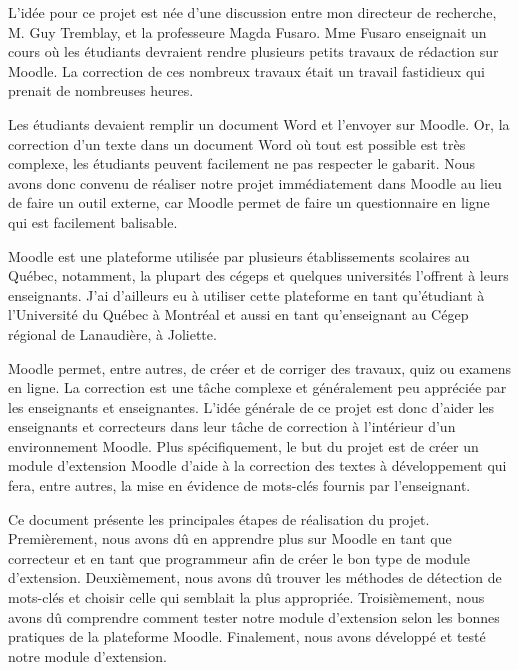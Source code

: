 \begin{introduction}

L'id\'ee pour ce projet est n\'ee d'une discussion entre mon directeur de recherche, M. Guy Tremblay, et la professeure Magda Fusaro.
Mme Fusaro enseignait un cours o\`u les \'etudiants devraient rendre plusieurs petits travaux de r\'edaction sur Moodle.
La correction de ces nombreux travaux \'etait un travail fastidieux qui prenait de nombreuses heures.

Les \'etudiants devaient remplir un document Word et l'envoyer sur Moodle.
Or, la correction d'un texte dans un document Word o\`u tout est possible est tr\`es complexe, les \'etudiants peuvent facilement ne pas respecter le gabarit.
Nous avons donc convenu de r\'ealiser notre projet imm\'ediatement dans Moodle au lieu de faire un outil externe, car Moodle permet de faire un questionnaire en ligne qui est facilement balisable.

Moodle est une plateforme utilisée par plusieurs établissements scolaires au Québec, notamment, la plupart des cégeps et quelques universités l'offrent à leurs enseignants.
J'ai d'ailleurs eu à utiliser cette plateforme en tant qu'étudiant à l'Université du Québec à Montréal et aussi en tant qu'enseignant au Cégep régional de Lanaudière, à Joliette.

Moodle permet, entre autres, de créer et de corriger des travaux, quiz ou examens en ligne.
La correction est une tâche complexe et g\'en\'eralement peu appréciée par les enseignants et enseignantes.
L'idée générale de ce projet est donc d'aider les enseignants et correcteurs dans leur tâche de correction à l'intérieur d'un environnement Moodle.
Plus sp\'ecifiquement, le but du projet est de créer un module d'extension Moodle d'aide à la correction des textes à développement qui fera, entre autres, la mise en évidence de mots-clés fournis par l'enseignant.

Ce document pr\'esente les principales étapes de réalisation du projet.
Premièrement, nous avons d\^u en apprendre plus sur Moodle en tant que correcteur et en tant que programmeur afin de créer le bon type de module d'extension.
Deuxièmement, nous avons d\^u trouver les méthodes de détection de mots-clés et choisir celle qui semblait la plus appropri\'ee.
Troisièmement, nous avons d\^u comprendre comment tester notre module d'extension selon les bonnes pratiques de la plateforme Moodle.
Finalement, nous avons développ\'e et test\'e notre module d'extension.

\end{introduction}
